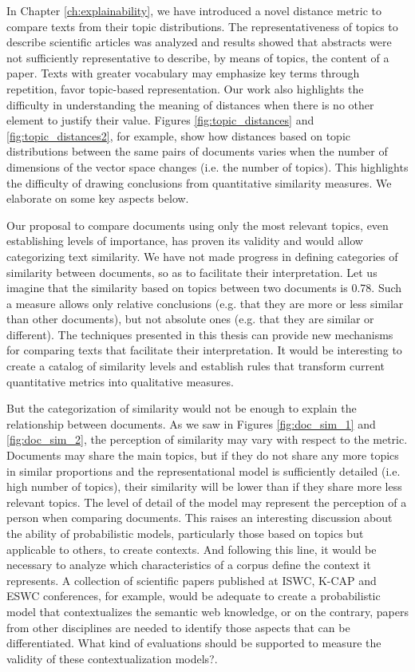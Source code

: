 In Chapter \ref{ch:explainability}, we have introduced a novel distance metric to compare texts from their topic distributions. The representativeness of topics to describe scientific articles was analyzed and results showed that abstracts were not sufficiently representative to describe, by means of topics, the content of a paper. Texts with greater vocabulary may emphasize key terms through repetition, favor topic-based representation. Our work also highlights the difficulty in understanding the meaning of distances when there is no other element to justify their value. Figures \ref{fig:topic_distances} and \ref{fig:topic_distances2}, for example, show how distances based on topic distributions between the same pairs of documents varies when the number of dimensions of the vector space changes (i.e. the number of topics). This highlights the difficulty of drawing conclusions from quantitative similarity measures. We elaborate on some key aspects below.

Our proposal to compare documents using only the most relevant topics, even establishing levels of importance, has proven its validity and would allow categorizing text similarity. We have not made progress in defining categories of similarity between documents, so as to facilitate their interpretation. Let us imagine that the similarity based on topics between two documents is 0.78. Such a measure allows only relative conclusions (e.g. that they are more or less similar than other documents), but not absolute ones (e.g. that they are similar or different). The techniques presented in this thesis can provide new mechanisms for comparing texts that facilitate their interpretation. It would be interesting to create a catalog of similarity levels and establish rules that transform current quantitative metrics into qualitative measures.
  
  
But the categorization of similarity would not be enough to explain the relationship between documents. As we saw in Figures \ref{fig:doc_sim_1} and \ref{fig:doc_sim_2}, the perception of similarity may vary with respect to the metric. Documents may share the main topics, but if they do not share any more topics in similar proportions and the representational model is sufficiently detailed (i.e. high number of topics), their similarity will be lower than if they share more less relevant topics. The level of detail of the model may represent the perception of a person when comparing documents. This raises an interesting discussion about the ability of probabilistic models, particularly those based on topics but applicable to others, to create contexts. And following this line, it would be necessary to analyze which characteristics of a corpus define the context it represents. A collection of scientific papers published at ISWC, K-CAP and ESWC conferences, for example, would be adequate to create a probabilistic model that contextualizes the semantic web knowledge, or on the contrary, papers from other disciplines are needed to identify those aspects that can be differentiated. What kind of evaluations should be supported to measure the validity of these contextualization models?.

